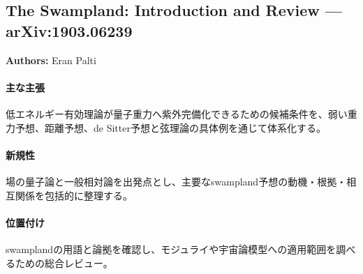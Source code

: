 \subsection{The Swampland: Introduction and Review --- arXiv:1903.06239}

\textbf{Authors:} Eran Palti

\paragraph{主な主張}
低エネルギー有効理論が量子重力へ紫外完備化できるための候補条件を、弱い重力予想、距離予想、de Sitter予想と弦理論の具体例を通じて体系化する\cite{Palti:2019pca}。

\paragraph{新規性}
場の量子論と一般相対論を出発点とし、主要なswampland予想の動機・根拠・相互関係を包括的に整理する。

\paragraph{位置付け}
swamplandの用語と論拠を確認し、モジュライや宇宙論模型への適用範囲を調べるための総合レビュー。
